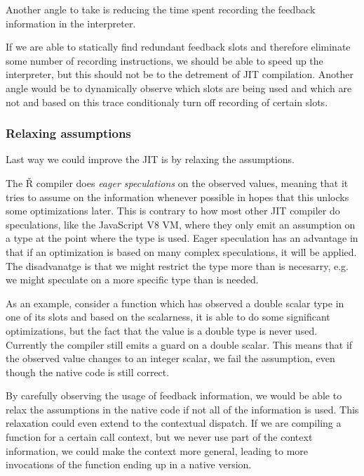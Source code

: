 Another angle to take is reducing the time spent recording the feedback information in the interpreter.

If we are able to statically find redundant feedback slots and therefore eliminate some number of recording instructions, we should be able to speed up the interpreter, but this should not be to the detrement of JIT compilation. Another angle would be to dynamically observe which slots are being used and which are not and based on this trace conditionaly turn off recording of certain slots.

\subsubsection*{Relaxing assumptions}

Last way we could improve the JIT is by relaxing the assumptions.

The Ř compiler does \textit{eager speculations} on the observed values, meaning that it tries to assume on the information whenever possible in hopes that this unlocks some optimizations later. This is contrary to how most other JIT compiler do speculations, like the JavaScript V8 VM\todocite, where they only emit an assumption on a type at the point where the type is used. Eager speculation has an advantage in that if an optimization is based on many complex speculations, it will be applied. The disadvanatge is that we might restrict the type more than is necesarry, e.g. we might speculate on a more specific type than is needed.

As an example, consider a function which has observed a double scalar type in one of its slots and based on the scalarness, it is able to do some significant optimizations, but the fact that the value is a double type is never used. Currently the compiler still emits a guard on a double scalar. This means that if the observed value changes to an integer scalar, we fail the assumption, even though the native code is still correct.

By carefully observing the usage of feedback information, we would be able to relax the assumptions in the native code if not all of the information is used. This relaxation could even extend to the contextual dispatch. If we are compiling a function for a certain call context, but we never use part of the context information, we could make the context more general, leading to more invocations of the function ending up in a native version.

